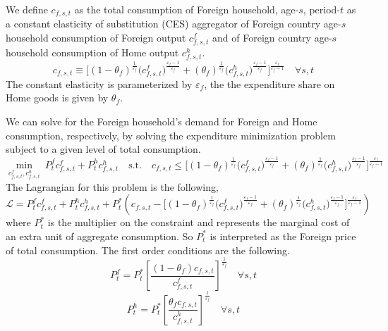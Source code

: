 \documentclass[letterpaper,12pt]{article}
\theoremstyle{definition}
\newcommand\ve{\varepsilon}
\begin{document}
    We define $c_{f,s,t}$ as the total consumption of Foreign household, age-$s$, period-$t$ as a constant elasticity of substitution (CES) aggregator of Foreign country age-$s$ household consumption of Foreign output $c^f_{f,s,t}$ and of Foreign country age-$s$ household consumption of Home output $c^h_{f,s,t}$.
    \begin{equation}\label{EqLgOpenHHcfCES}
      c_{f,s,t}\equiv \biggl[(1 - \theta_f)^\frac{1}{\ve_f}\bigl(c^f_{f,s,t}\bigr)^\frac{\ve_f-1}{\ve_f} + (\theta_f)^\frac{1}{\ve_f}\bigl(c^h_{f,s,t}\bigr)^\frac{\ve_f-1}{\ve_f}\biggr]^\frac{\ve_f}{\ve_f-1} \quad\forall s,t
    \end{equation}
    The constant elasticity is parameterized by $\ve_f$, the the expenditure share on Home goods is given by $\theta_f$.

    We can solve for the Foreign household's demand for Foreign and Home consumption, respectively, by solving the expenditure minimization problem subject to a given level of total consumption.
    \begin{equation}\label{EqLgOpenHHminprobF}
      \min_{c^f_{f,s,t},c^h_{f,s,t}} \: P^f_t c^f_{f,s,t} + P^h_t c^h_{f,s,t} \quad \text{s.t.} \quad c_{f,s,t} \leq \biggl[(1 - \theta_f)^\frac{1}{\ve_f}\bigl(c^f_{f,s,t}\bigr)^\frac{\ve_f-1}{\ve_f} + (\theta_f)^\frac{1}{\ve_f}\bigl(c^h_{f,s,t}\bigr)^\frac{\ve_f-1}{\ve_f}\biggr]^\frac{\ve_f}{\ve_f-1}
    \end{equation}
    The Lagrangian for this problem is the following,
    \begin{equation}\label{EqLgOpenHHlagrF}
      \mathcal{L} = P^f_t c^f_{f,s,t} + P^h_t c^h_{f,s,t} + P^*_t\left(c_{f,s,t} - \biggl[(1 - \theta_f)^\frac{1}{\ve_f}\bigl(c^f_{f,s,t}\bigr)^\frac{\ve_f-1}{\ve_f} + (\theta_f)^\frac{1}{\ve_f}\bigl(c^h_{f,s,t}\bigr)^\frac{\ve_f-1}{\ve_f}\biggr]^\frac{\ve_f}{\ve_f-1}\right)
    \end{equation}
    where $P^*_t$ is the multiplier on the constraint and represents the marginal cost of an extra unit of aggregate consumption. So $P^*_t$ is interpreted as the Foreign price of total consumption. The first order conditions are the following.
    \begin{equation}\label{EqLgOpenHHfocCff}
      P^f_t = P^*_t\left[\frac{(1-\theta_f) c_{f,s,t}}{c^f_{f,s,t}}\right]^{\frac{1}{\ve_f}} \quad\forall s,t
    \end{equation}
    \begin{equation}\label{EqLgOpenHHfocCfh}
      P^h_t = P^*_t\left[\frac{\theta_f c_{f,s,t}}{c^h_{f,s,t}}\right]^{\frac{1}{\ve_f}} \quad\forall s,t
    \end{equation}
\end{document}

